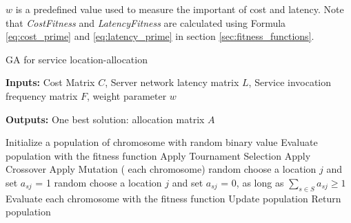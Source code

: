 \documentclass{llncs}
\begin{document}
\begin{flushleft}
\begin{flushleft}
	$w$ is a predefined value used to measure the important of cost and latency. Note that \emph{CostFitness} and \emph{LatencyFitness}
	are calculated using Formula \ref{eq:cost_prime} and \ref{eq:latency_prime} in section \ref{sec:fitness_functions}.


\begin{algorithm}[htb]
	\caption{GA for service location-allocation}
	\textbf{Inputs:}
		Cost Matrix $C$,
		Server network latency matrix $L$, 
		Service invocation frequency matrix $F$, 
		weight parameter $w$

	\textbf{Outputs:}
		One best solution: allocation matrix $A$


	\begin{algorithmic}[1]
		\State Initialize a population of chromosome with random binary value
		\State Evaluate population with the fitness function
			\State Apply Tournament Selection
			\State Apply Crossover 
			\State Apply Mutation
			\For( each chromosome)
					\State random choose a location $j$ and set $a_{sj}$ = 1
				\EndWhile
					\State random choose a location $j$ and set $a_{sj}$ = 0, as long as $\sum\limits_{s \in S} a_{sj} \geq 1$
				\EndWhile
			\State Evaluate each chromosome with the fitness function
			\EndFor
			\State Update population
			\EndWhile
		\State Return population
	\end{algorithmic}
\end{algorithm}




\end{flushleft}
\end{flushleft}
\end{document}
